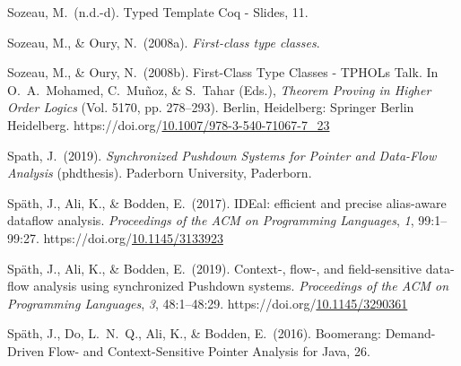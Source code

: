 \documentclass[12pt,twoside]{article}
\begin{document}
{\begin{thebibliography}{1079}
\mdbibitemlabel{}Sozeau, M.~(n.d.-d). Typed Template Coq - Slides, 11.%

\mdbibitemlabel{}Sozeau, M., \& Oury, N.~(2008a). \emph{First-class type classes}.%

\mdbibitemlabel{}Sozeau, M., \& Oury, N.~(2008b). First-Class Type Classes - TPHOLs Talk. In O.~A.~Mohamed, C.~Muñoz, \& S.~Tahar (Eds.), \emph{Theorem Proving in Higher Order Logics} (Vol. 5170, pp. 278–293). Berlin, Heidelberg: Springer Berlin Heidelberg. https://doi.org/\href{https://dx.doi.org/10.1007/978-3-540-71067-7_23}{10.1007/978-3-540-71067-7\_23}%

\mdbibitemlabel{}Spath, J.~(2019). \emph{Synchronized Pushdown Systems for Pointer and Data-Flow Analysis} (phdthesis). Paderborn University, Paderborn.%

\mdbibitemlabel{}Späth, J., Ali, K., \& Bodden, E.~(2017). IDEal: efficient and precise alias-aware dataflow analysis. \emph{Proceedings of the ACM on Programming Languages}, \emph{1}, 99:1–99:27. https://doi.org/\href{https://dx.doi.org/10.1145/3133923}{10.1145/3133923}%

\mdbibitemlabel{}Späth, J., Ali, K., \& Bodden, E.~(2019). Context-, flow-, and field-sensitive data-flow analysis using synchronized Pushdown systems. \emph{Proceedings of the ACM on Programming Languages}, \emph{3}, 48:1–48:29. https://doi.org/\href{https://dx.doi.org/10.1145/3290361}{10.1145/3290361}%

\mdbibitemlabel{}Späth, J., Do, L.~N.~Q., Ali, K., \& Bodden, E.~(2016). Boomerang: Demand-Driven Flow- and Context-Sensitive Pointer Analysis for Java, 26.%


\end{thebibliography}}
\end{document}
